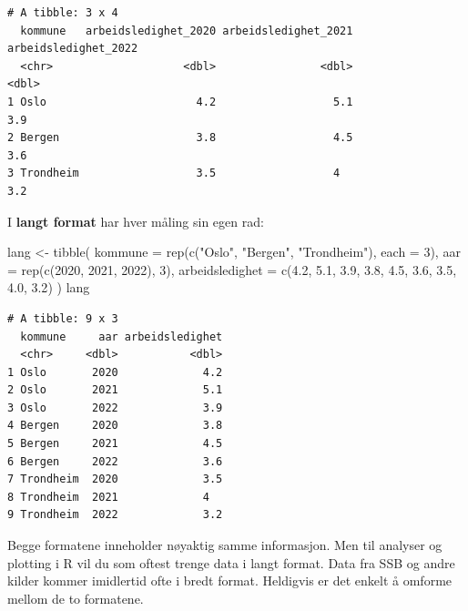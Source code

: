 \documentclass[
  norsk,
  letterpaper,
  DIV=11,
  numbers=noendperiod]{scrreprt}
\newenvironment{Shaded}{\begin{snugshade}}{\end{snugshade}}
\newcommand{\AttributeTok}[1]{\textcolor[rgb]{0.40,0.45,0.13}{#1}}
\newcommand{\DecValTok}[1]{\textcolor[rgb]{0.68,0.00,0.00}{#1}}
\newcommand{\FloatTok}[1]{\textcolor[rgb]{0.68,0.00,0.00}{#1}}
\newcommand{\FunctionTok}[1]{\textcolor[rgb]{0.28,0.35,0.67}{#1}}
\newcommand{\NormalTok}[1]{\textcolor[rgb]{0.00,0.23,0.31}{#1}}
\newcommand{\OtherTok}[1]{\textcolor[rgb]{0.00,0.23,0.31}{#1}}
\newcommand{\StringTok}[1]{\textcolor[rgb]{0.13,0.47,0.30}{#1}}
\theoremstyle{definition}
\theoremstyle{remark}
\begin{document}
\begin{verbatim}
# A tibble: 3 x 4
  kommune   arbeidsledighet_2020 arbeidsledighet_2021 arbeidsledighet_2022
  <chr>                    <dbl>                <dbl>                <dbl>
1 Oslo                       4.2                  5.1                  3.9
2 Bergen                     3.8                  4.5                  3.6
3 Trondheim                  3.5                  4                    3.2
\end{verbatim}

I \textbf{langt format} har hver måling sin egen rad:

\begin{Shaded}
\begin{Highlighting}[]
\NormalTok{lang }\OtherTok{\textless{}{-}} \FunctionTok{tibble}\NormalTok{(}
  \AttributeTok{kommune =} \FunctionTok{rep}\NormalTok{(}\FunctionTok{c}\NormalTok{(}\StringTok{"Oslo"}\NormalTok{, }\StringTok{"Bergen"}\NormalTok{, }\StringTok{"Trondheim"}\NormalTok{), }\AttributeTok{each =} \DecValTok{3}\NormalTok{),}
  \AttributeTok{aar =} \FunctionTok{rep}\NormalTok{(}\FunctionTok{c}\NormalTok{(}\DecValTok{2020}\NormalTok{, }\DecValTok{2021}\NormalTok{, }\DecValTok{2022}\NormalTok{), }\DecValTok{3}\NormalTok{),}
  \AttributeTok{arbeidsledighet =} \FunctionTok{c}\NormalTok{(}\FloatTok{4.2}\NormalTok{, }\FloatTok{5.1}\NormalTok{, }\FloatTok{3.9}\NormalTok{, }\FloatTok{3.8}\NormalTok{, }\FloatTok{4.5}\NormalTok{, }\FloatTok{3.6}\NormalTok{, }\FloatTok{3.5}\NormalTok{, }\FloatTok{4.0}\NormalTok{, }\FloatTok{3.2}\NormalTok{)}
\NormalTok{)}
\NormalTok{lang}
\end{Highlighting}
\end{Shaded}

\begin{verbatim}
# A tibble: 9 x 3
  kommune     aar arbeidsledighet
  <chr>     <dbl>           <dbl>
1 Oslo       2020             4.2
2 Oslo       2021             5.1
3 Oslo       2022             3.9
4 Bergen     2020             3.8
5 Bergen     2021             4.5
6 Bergen     2022             3.6
7 Trondheim  2020             3.5
8 Trondheim  2021             4  
9 Trondheim  2022             3.2
\end{verbatim}

Begge formatene inneholder nøyaktig samme informasjon. Men til analyser
og plotting i R vil du som oftest trenge data i langt format. Data fra
SSB og andre kilder kommer imidlertid ofte i bredt format. Heldigvis er
det enkelt å omforme mellom de to formatene.
\end{document}
